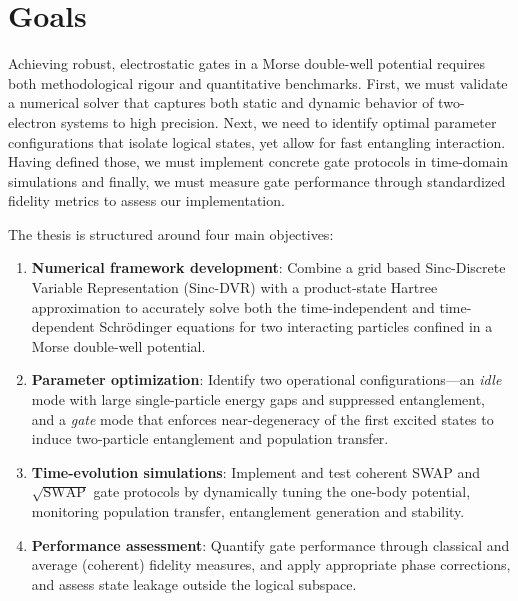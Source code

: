 \documentclass{subfiles}
\begin{document}
\section{Goals}
Achieving robust, electrostatic gates in a Morse double-well potential requires both methodological rigour and quantitative benchmarks. First, we must validate a numerical solver that captures both static and dynamic behavior of two-electron systems to high precision. Next, we need to identify optimal parameter configurations that isolate logical states, yet allow for fast entangling interaction. Having defined those, we must implement concrete gate protocols in time-domain simulations and finally, we must measure gate performance through standardized fidelity metrics to assess our implementation.

The thesis is structured around four main objectives:
\begin{enumerate}
\item \textbf{Numerical framework development}: Combine a grid based Sinc-Discrete Variable Representation (Sinc-DVR) with a product-state Hartree approximation to accurately solve both the time-independent and time-dependent Schrödinger equations for two interacting particles confined in a Morse double-well potential.
\item \textbf{Parameter optimization}: Identify two operational configurations—an \textit{idle} mode with large single-particle energy gaps and suppressed entanglement, and a \textit{gate} mode that enforces near-degeneracy of the first excited states to induce two-particle entanglement and population transfer.
\item \textbf{Time-evolution simulations}: Implement and test coherent SWAP and $\sqrt{\text{SWAP}}$ gate protocols by dynamically tuning the one-body potential, monitoring population transfer, entanglement generation and stability.
\item \textbf{Performance assessment}: Quantify gate performance through classical and average (coherent) fidelity measures, and apply appropriate phase corrections, and assess state leakage outside the logical subspace.
\end{enumerate}
\end{document}
